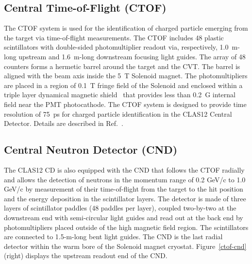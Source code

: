 \documentclass[final,3p,twocolumn]{elsarticle}
\begin{document}
\subsection{\rm Central Time-of-Flight (CTOF)}
The CTOF system is used for the identification of charged particle emerging 
from the target via time-of-flight measurements. The CTOF includes 48 plastic scintillators with 
double-sided photomultiplier readout via, respectively, 1.0~m-long 
upstream and 1.6~m-long downstream focusing light guides. The array of 48 counters forms a hermetic barrel around the target and the CVT. The barrel is aligned with the beam axis inside the 5~T Solenoid magnet. The 
photomultipliers are placed in a region of 0.1~T fringe field of the Solenoid and enclosed within a triple layer dynamical magnetic shield~\cite{Baturin:2012zz} that provides less than 0.2~G internal field near the PMT photocathode. The CTOF system is designed to provide time resolution of 75~ps for charged particle identification in the CLAS12 Central Detector. Details are described in Ref.~\cite{CTOF}.  

\subsection{\rm Central Neutron Detector (CND)}
The CLAS12 CD is also equipped with the CND that follows the CTOF radially and allows the 
detection of neutrons in the momentum range of 0.2 GeV/c to 1.0 GeV/c by measurement of their time-of-flight from the target 
to the hit position and the energy deposition in the scintillator layers. The detector is made of three layers of scintillator paddles (48 paddles per layer), coupled two-by-two at the downstream end with semi-circular light guides and read out at the back end by photomultipliers placed outside of the high magnetic field region. The scintillators are connected to 1.5-m-long bent 
light guides. The CND is the last radial detector within the warm bore of the Solenoid magnet cryostat. 
Figure~\ref{ctof-cnd} (right) displays the upstream readout end of the CND. 
\end{document}
